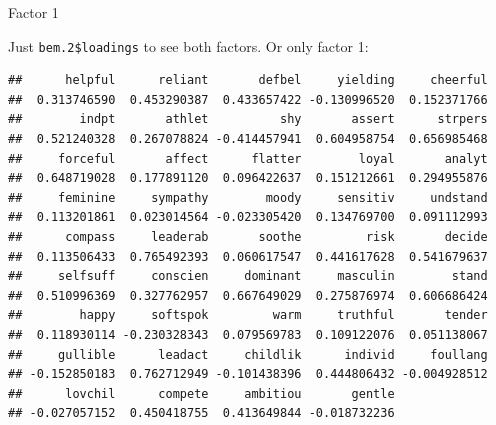 \begin{frame}[fragile]{Factor 1}

 Just \texttt{bem.2\$loadings} to see both factors. Or only factor 1:

 {\scriptsize
\begin{knitrout}
\color{fgcolor}\begin{kframe}
\begin{alltt}
\hlopt{$}\hlstd{loadings[,}\hlstd{]}
\end{alltt}
\begin{verbatim}
##      helpful      reliant       defbel     yielding     cheerful 
##  0.313746590  0.453290387  0.433657422 -0.130996520  0.152371766 
##        indpt       athlet          shy       assert      strpers 
##  0.521240328  0.267078824 -0.414457941  0.604958754  0.656985468 
##     forceful       affect      flatter        loyal       analyt 
##  0.648719028  0.177891120  0.096422637  0.151212661  0.294955876 
##     feminine     sympathy        moody     sensitiv     undstand 
##  0.113201861  0.023014564 -0.023305420  0.134769700  0.091112993 
##      compass     leaderab       soothe         risk       decide 
##  0.113506433  0.765492393  0.060617547  0.441617628  0.541679637 
##     selfsuff     conscien     dominant     masculin        stand 
##  0.510996369  0.327762957  0.667649029  0.275876974  0.606686424 
##        happy     softspok         warm     truthful       tender 
##  0.118930114 -0.230328343  0.079569783  0.109122076  0.051138067 
##     gullible      leadact     childlik      individ     foullang 
## -0.152850183  0.762712949 -0.101438396  0.444806432 -0.004928512 
##      lovchil      compete     ambitiou       gentle 
## -0.027057152  0.450418755  0.413649844 -0.018732236
\end{verbatim}
\end{kframe}
\end{knitrout}
}



  
\end{frame}

